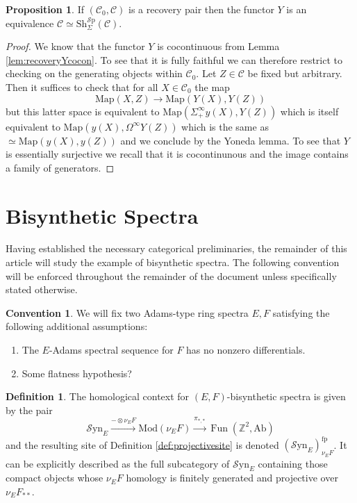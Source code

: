 \documentclass[10pt]{amsart}
\theoremstyle{definition}
\numberwithin{figure}{section}
\numberwithin{equation}{section}
\newtheorem{proposition}[figure]{Proposition}
\newtheorem{definition}[figure]{Definition}
\newtheorem{convention}[figure]{Convention}
\newcommand{\cC}{\mathcal{C}}
\theoremstyle{cited}
\newcommand{\bZ}{\mathbb{Z}}
\newcommand{\Fun}{\operatorname{Fun}}
\newcommand{\Ab}{\mathrm{Ab}}
\newcommand{\Sp}{{\mathcal{S}\mathrm{p}}}
\newcommand{\Mod}{\mathrm{Mod}}
\newcommand{\Map}{\mathrm{Map}}
\newcommand{\Sh}{\mathrm{Sh}}
\newcommand{\fp}{\mathrm{fp}}
\newcommand{\Syn}{\mathcal{S}\mathrm{yn}}
\begin{document}
\begin{proposition}\label{prop:recpairrecovers}
  If $(\cC_0,\cC)$ is a recovery pair then the functor $Y$ is an equivalence $\cC\simeq \Sh_\Sigma^\Sp(\cC)$.
\end{proposition}

\begin{proof}
  We know that the functor $Y$ is cocontinuous from Lemma \ref{lem:recoveryYcocon}. To see that it is fully faithful we can therefore restrict to checking on the generating objects within $\cC_0$. Let $Z\in \cC$ be fixed but arbitrary. Then it suffices to check that for all $X\in \cC_0$ the map
  \[
    \Map(X,Z)\to \Map(Y(X),Y(Z))
  \]
  but this latter space is equivalent to $\Map(\Sigma_+^\infty y(X), Y(Z))$ which is itself equivalent to $\Map(y(X), \Omega^\infty Y(Z))$ which is the same as $\simeq\Map(y(X),y(Z))$ and we conclude by the Yoneda lemma. To see that $Y$ is essentially surjective we recall that it is cocontinunous and the image contains a family of generators.
\end{proof} 


\section{Bisynthetic Spectra}

Having established the necessary categorical preliminaries, the remainder of this article will study the example of bisynthetic spectra. The following convention will be enforced throughout the remainder of the document unless specifically stated otherwise. 

\begin{convention}\label{conv:eandf}
  We will fix two Adams-type ring spectra $E,F$ satisfying the following additional assumptions:
  \begin{enumerate}
      \item The $E$-Adams spectral sequence for $F$ has no nonzero differentials.
      \item Some flatness hypothesis?
  \end{enumerate}
\end{convention}

\begin{definition}
  The homological context for $(E,F)$-bisynthetic spectra is given by the pair
  \[
  \Syn_{E} \xrightarrow{-\otimes \nu_E F} \Mod(\nu_E F) \xrightarrow{\pi_{*,*}} \Fun(\bZ^2, \Ab)
  \]
  and the resulting site of Definition \ref{def:projectivesite} is denoted $(\Syn_E)_{\nu_E F}^\fp$. It can be explicitly described as the full subcategory of $\Syn_E$ containing those compact objects whose $\nu_E F$ homology is finitely generated and projective over $\nu_E F_{**}$.
\end{definition}
\end{document}
